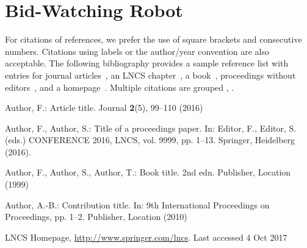\documentclass[runningheads]{llncs}
\begin{document}
\section{Bid-Watching Robot} 


For citations of references, we prefer the use of square brackets
and consecutive numbers. Citations using labels or the author/year
convention are also acceptable. The following bibliography provides
a sample reference list with entries for journal
articles~\cite{ref_article1}, an LNCS chapter~\cite{ref_lncs1}, a
book~\cite{ref_book1}, proceedings without editors~\cite{ref_proc1},
and a homepage~\cite{ref_url1}. Multiple citations are grouped
\cite{ref_article1,ref_lncs1,ref_book1},
\cite{ref_article1,ref_book1,ref_proc1,ref_url1}.
%
%
%
% 
% 
%
\begin{thebibliography}{8}
Author, F.: Article title. Journal \textbf{2}(5), 99--110 (2016)

Author, F., Author, S.: Title of a proceedings paper. In: Editor,
F., Editor, S. (eds.) CONFERENCE 2016, LNCS, vol. 9999, pp. 1--13.
Springer, Heidelberg (2016). 

Author, F., Author, S., Author, T.: Book title. 2nd edn. Publisher,
Location (1999)

Author, A.-B.: Contribution title. In: 9th International Proceedings
on Proceedings, pp. 1--2. Publisher, Location (2010)

LNCS Homepage, \url{http://www.springer.com/lncs}. Last accessed 4
Oct 2017
\end{thebibliography}
\end{document}
